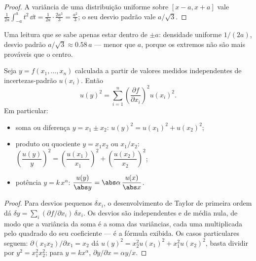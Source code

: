\begin{proof}
A variância de uma distribuição uniforme sobre $[x - a, x + a]$ vale
$\frac{1}{2a}\int_{-a}^{a} t^2\,\dd t = \frac{1}{2a}\cdot\frac{2a^3}{3}
= \frac{a^2}{3}$; o seu desvio padrão vale $a/\sqrt3$.
\end{proof}

\begin{omfigure}

{\small Uma leitura que se sabe apenas estar dentro de $\pm a$: densidade
uniforme $1/(2a)$, desvio padrão $a/\sqrt3 \approx 0.58\,a$ --- menor que
$a$, porque os extremos não são mais prováveis que o centro.}
\end{omfigure}

\begin{theorem}\label{thm:b1:units-dimensions:propagation}
Seja $y = f(x_1, \dots, x_n)$ calculada a partir de valores medidos
independentes de incertezas-padrão $u(x_i)$. Então
\[
u(y)^2 = \sum_{i=1}^n \left(\frac{\partial f}{\partial x_i}\right)^2 u(x_i)^2 .
\]
Em particular:
\begin{itemize}
  \item soma ou diferença $y = x_1 \pm x_2$:
        $u(y)^2 = u(x_1)^2 + u(x_2)^2$;
  \item produto ou quociente $y = x_1 x_2$ ou $x_1/x_2$:
        $\left(\dfrac{u(y)}{y}\right)^2 = \left(\dfrac{u(x_1)}{x_1}\right)^2
        + \left(\dfrac{u(x_2)}{x_2}\right)^2$;
  \item potência $y = k\,x^\alpha$: $\dfrac{u(y)}{\abs y} = \abs\alpha\,\dfrac{u(x)}{\abs x}$.
\end{itemize}
\end{theorem}

\begin{proof}
Para desvios pequenos $\delta x_i$, o desenvolvimento de Taylor de
primeira ordem dá $\delta y = \sum_i (\partial f/\partial x_i)\,\delta x_i$.
Os desvios são independentes e de média nula, de modo que a variância da
soma é a soma das variâncias, cada uma multiplicada pelo quadrado do seu
coeficiente --- é a fórmula exibida. Os casos particulares seguem:
$\partial(x_1 x_2)/\partial x_1 = x_2$ dá
$u(y)^2 = x_2^2 u(x_1)^2 + x_1^2 u(x_2)^2$, basta dividir por $y^2 = x_1^2 x_2^2$;
para $y = kx^\alpha$, $\partial y/\partial x = \alpha y/x$.
\end{proof}

